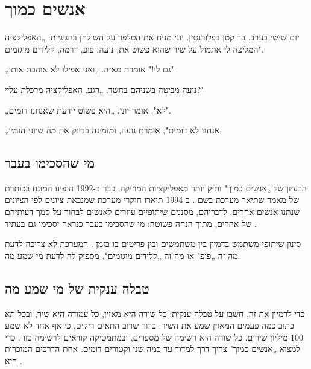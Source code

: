 
\chapter{אנשים כמוך}\label{ch:3}

\begin{scene}
יום שישי בערב, בר קטן בפלורנטין. יוני מניח את הטלפון על השולחן בחגיגיות: „האפליקציה המליצה לי אתמול על שיר שהוא פשוט את, נועה. פופ, דרמה, קלידים מוגזמים".

„גם לי!" אומרת מאיה. „ואני אפילו לא אוהבת אותו".

נועה מביטה בשניהם בחשד. „רגע. האפליקציה מרכלת עליי?"

„לא", אומר יוני. „היא פשוט יודעת שאנחנו דומים".

„אנחנו לא דומים", אומרת נועה, ומזמינה בדיוק את מה שיוני הזמין.
\end{scene}

\section{מי שהסכימו בעבר}

הרעיון של „אנשים כמוך" ותיק יותר מאפליקציות המוזיקה. כבר ב-1992 הופיע המונח  בכותרת של מאמר שתיאר מערכת בשם  \cite{goldberg1992using}. ב-1994 תיארו חוקרי  מערכת שמנבאת ציונים לפי הציונים שנתנו אנשים אחרים. לדבריהם, מסננים שיתופיים עוזרים לאנשים לבחור על סמך דעותיהם של אחרים, מתוך הנחה פשוטה: מי שהסכימו בעבר כנראה יסכימו גם בעתיד \cite{resnick1994grouplens}.

סינון שיתופי משתמש בדמיון בין משתמשים ובין פריטים בו בזמן \cite{google2026candidate}. המערכת לא צריכה לדעת מה זה „פופ" או מה זה „קלידים מוגזמים". מספיק לה לדעת מי שמע מה.

\section{טבלה ענקית של מי שמע מה}

כדי לדמיין את זה, חשבו על טבלה ענקית: כל שורה היא מאזין, כל עמודה היא שיר, ובכל תא כתוב כמה פעמים המאזין שמע את השיר. ברור שרוב התאים ריקים, כי אף אחד לא שמע 100 מיליון שירים. כל שורה היא רשימה של מספרים, ובמתמטיקה קוראים לרשימה כזו . כדי למצוא „אנשים כמוך" צריך דרך למדוד עד כמה שני וקטורים דומים. אחת הדרכים המוכרות היא .

